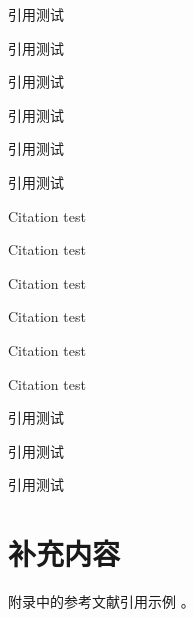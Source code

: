 \documentclass[degree=doctor]{thuthesis}
\begin{document}
\START
\showoutput

引用\citet{zhangkun1994}测试\par
引用\citet[42]{zhangkun1994}测试\par
引用\citep{zhangkun1994}测试\par
引用\citep[42]{zhangkun1994}测试\par
引用\citep[见][]{zhukezhen1973}测试\par
引用\citep[见][42]{zhukezhen1973}测试\par

Citation \citet{dupont1974bone} test\par
Citation \citet[42]{dupont1974bone} test\par
Citation\citep{dupont1974bone} test\par
Citation\citep[42]{dupont1974bone} test\par
Citation \citep[see][]{zhengkaiqing1987} test\par
Citation \citep[see][42]{zhengkaiqing1987} test\par

引用\citep{zhangkun1994}测试\par
引用\citep{zhukezhen1973,dupont1974bone}测试\par
引用\citep{zhengkaiqing1987,jiangxizhou1980,jianduju1994}测试\par

\nocite{*}




\appendix

\chapter{补充内容}

附录\cite{dupont1974bone}中的参考文献引用\cite{zhengkaiqing1987}示例
\cite{dupont1974bone,zhengkaiqing1987}。

\printbibliography

\clearpage
\OMIT
\end{document}
